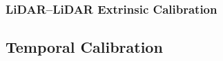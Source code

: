 \documentclass{erauthesis}
\begin{document}



\subsubsection{LiDAR–LiDAR Extrinsic Calibration} \label{lidarLidar_calib}

\subsection{Temporal Calibration}\label{time_sync}
\end{document}
